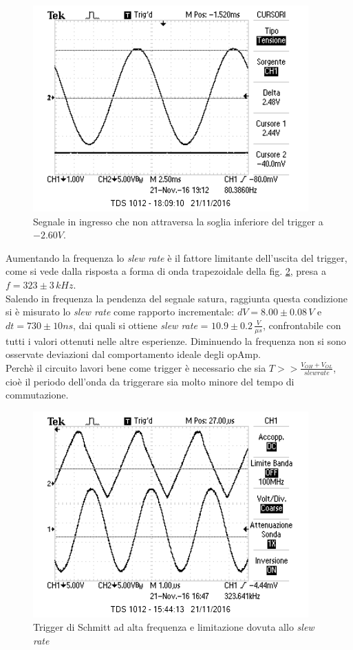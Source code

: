 \documentclass[10pt,a4paper]{article}
\begin{document}
\begin{figure}[htb!]
\centering
\includegraphics[scale=1.0]{immagini/sottoSogliaInferiore.png}
\caption{Segnale in ingresso che non attraversa la soglia inferiore del trigger a $-2.60V$.}
\label{sottoSoglia}
\end{figure}

Aumentando la frequenza  lo \emph{slew rate} è il fattore limitante dell'uscita del trigger, come si vede dalla risposta a forma di onda trapezoidale della fig. \ref{slew}, presa a $f = 323 \pm 3 \, kHz$. \\
Salendo in frequenza la pendenza del segnale satura, raggiunta questa condizione si è misurato lo \emph{slew rate} come rapporto incrementale: $dV = 8.00 \pm 0.08 \, V$ e $dt = 730 \pm 10 ns$, dai quali si ottiene \emph{slew rate} = $10.9 \pm 0.2 \, \frac{V}{\mu s}$, confrontabile con tutti i valori ottenuti nelle altre esperienze. Diminuendo la frequenza non si sono osservate deviazioni dal comportamento ideale degli opAmp. \\
Perchè il circuito lavori bene come trigger è necessario che sia $T >> \frac{V_{OH}+V_{OL}}{slew rate}$, cioè il periodo dell'onda da triggerare sia molto minore del tempo di commutazione.


\begin{figure}[htb!]
\centering
\includegraphics[scale=1.0]{immagini/slewRate.png}
\caption{Trigger di Schmitt ad alta frequenza e limitazione dovuta allo \emph{slew rate}}
\label{slew}
\end{figure}
\end{document}
